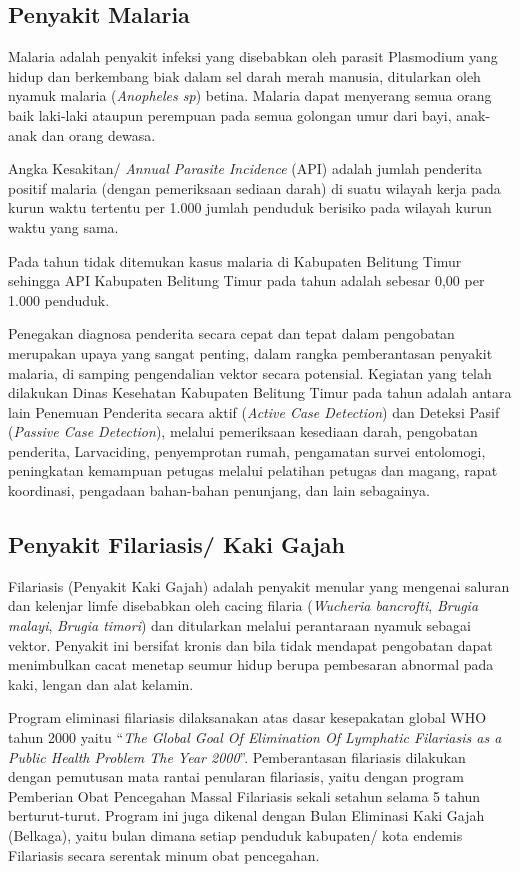\subsection{Penyakit Malaria}
Malaria adalah penyakit infeksi yang disebabkan oleh parasit Plasmodium yang hidup dan berkembang biak dalam sel darah merah manusia, ditularkan oleh nyamuk malaria (\emph{Anopheles sp}) betina.
Malaria dapat menyerang semua orang baik laki-laki ataupun perempuan pada semua golongan umur dari bayi, anak-anak dan orang dewasa.

Angka Kesakitan/ \emph{Annual Parasite Incidence} (API) adalah jumlah penderita positif malaria (dengan pemeriksaan sediaan darah) di suatu wilayah kerja pada kurun waktu
tertentu per 1.000 jumlah penduduk berisiko pada wilayah kurun waktu yang sama.

Pada tahun \tP tidak ditemukan kasus malaria di Kabupaten Belitung Timur sehingga API Kabupaten Belitung Timur pada tahun \tP adalah sebesar 0,00 per 1.000 penduduk.

Penegakan diagnosa penderita secara cepat dan tepat dalam pengobatan merupakan upaya yang sangat penting, dalam rangka pemberantasan penyakit malaria, di samping pengendalian vektor secara potensial.
Kegiatan yang telah dilakukan Dinas Kesehatan Kabupaten Belitung Timur pada tahun \tP adalah antara lain Penemuan Penderita secara aktif (\emph{Active Case Detection}) dan Deteksi Pasif (\emph{Passive Case Detection}), melalui pemeriksaan kesediaan darah, pengobatan penderita, Larvaciding, penyemprotan rumah, pengamatan survei entolomogi, peningkatan kemampuan petugas melalui pelatihan petugas dan magang, rapat koordinasi, pengadaan bahan-bahan penunjang, dan lain sebagainya.

\subsection{Penyakit Filariasis/ Kaki Gajah}
Filariasis (Penyakit Kaki Gajah) adalah penyakit menular yang mengenai saluran dan kelenjar limfe disebabkan oleh cacing filaria (\emph{Wucheria bancrofti}, \emph{Brugia malayi}, \emph{Brugia timori}) dan ditularkan melalui perantaraan nyamuk sebagai vektor.
Penyakit ini bersifat kronis dan bila tidak mendapat pengobatan dapat menimbulkan cacat menetap seumur hidup berupa pembesaran abnormal pada kaki, lengan dan alat kelamin.

Program eliminasi filariasis dilaksanakan atas dasar kesepakatan global WHO tahun 2000 yaitu “\emph{The Global Goal Of Elimination Of Lymphatic Filariasis as a Public Health Problem The Year 2000}”.
Pemberantasan filariasis dilakukan dengan pemutusan mata rantai penularan filariasis, yaitu dengan program Pemberian Obat Pencegahan Massal Filariasis sekali setahun selama 5 tahun berturut-turut.
Program ini juga dikenal dengan Bulan Eliminasi Kaki Gajah (Belkaga), yaitu bulan dimana setiap penduduk kabupaten/ kota endemis Filariasis secara serentak minum obat pencegahan.

